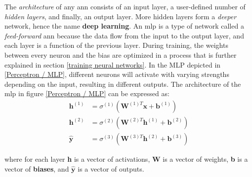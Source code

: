         The \textit{architecture} of any \gls{ann} consists of an input layer, a user-defined number of \textit{hidden layers}, and finally, an output layer\cite{razavi2021deep_exp_per}. More hidden layers form a \textit{deeper} network, hence the name \textbf{deep learning}. An \gls{mlp} is a type of network called a \textit{feed-forward} \gls{ann} because the data flow from the input to the output layer, and each layer is a function of the previous layer. During training, the weights between every neuron and the bias are optimized in a process that is  further explained in section \ref{training neural networks}. In the MLP depicted in \ref{Perceptron / MLP}, different neurons will activate with varying strengths depending on the input, resulting in different outputs. The architecture of the \gls{mlp} in figure \ref{Perceptron / MLP} can be expressed as\cite{Goodfellow-et-al-2016}:
        \begin{align}\label{mlp outputlayer eq}
            \textbf{h}^{(1)} &= \sigma^{(1)}(\textbf{W}^{(1)T}\textbf{x} + \textbf{b}^{(1)})\\
            \textbf{h}^{(2)} &= \sigma^{(2)}(\textbf{W}^{(2)T}\textbf{h}^{(1)} + \textbf{b}^{(2)})\\
            \hat{\textbf{y}} &= \sigma^{(3)}(\textbf{W}^{(3)T}\textbf{h}^{(2)} + \textbf{b}^{(3)})
        \end{align}

        
        
        
        where for each layer \textbf{h} is a vector of activations, \textbf{W} is a vector of weights, \textbf{b} is a  vector of \textbf{biases}, and $\hat{\textbf{y}}$ is a vector of outputs. %
        

